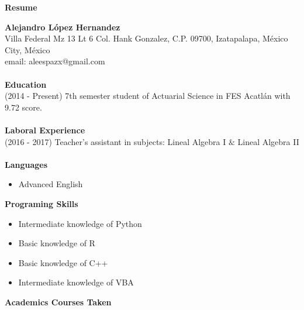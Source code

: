 \documentclass[11pt,letter]{article}
\begin{document}
\begin{center}
\textbf{Resume}
\end{center}
\textbf{Alejandro López Hernandez} \\ 
Villa Federal Mz 13 Lt 6 Col. Hank Gonzalez, C.P. 09700, Izatapalapa, México City, México\\ email: aleespazx@gmail.com\\\\
\textbf{Education}\\
(2014 - Present) 7th semester student of Actuarial Science in FES Acatlán with 9.72 score.\\\\
\textbf{Laboral Experience}\\
(2016 - 2017) Teacher's assistant in subjects: Lineal Algebra I $\&$ Lineal Algebra II\\\\
\textbf{Languages}
\begin{itemize}
\item Advanced English
\end{itemize}
\textbf{Programing Skills}
\begin{itemize}
\item Intermediate knowledge of Python
\item Basic knowledge of R
\item Basic knowledge of C++
\item Intermediate knowledge of VBA
\end{itemize}
\textbf{Academics Courses Taken}
\end{document}

